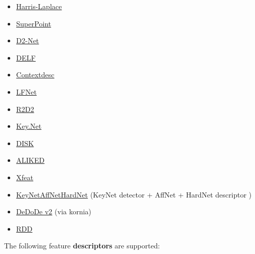 \documentclass{article}
\begin{document}
\begin{itemize}
    \item \href{https://www.robots.ox.ac.uk/~vgg/research/affine/det_eval_files/mikolajczyk_ijcv2004.pdf}{Harris-Laplace} \cite{mikolajczyk_inria00548554}
    \item \href{https://github.com/MagicLeapResearch/SuperPointPretrainedNetwork}{SuperPoint}\cite{detone18superpoint}
    \item \href{https://github.com/mihaidusmanu/d2-net}{D2-Net} \cite{dusmanu2019d2}
    \item \href{https://github.com/tensorflow/models/tree/master/research/delf}{DELF} \cite{noh2017large}
    \item \href{https://github.com/lzx551402/contextdesc}{Contextdesc} \cite{luo2020contextdesc}
    \item \href{https://github.com/vcg-uvic/lf-net-release}{LFNet} \cite{ono2018lf}
    \item \href{https://github.com/naver/r2d2}{R2D2} \cite{revaud2019r2d2}
    \item \href{https://github.com/axelBarroso/Key.Net}{Key.Net} \cite{barroso2020key}
    \item \href{https://arxiv.org/abs/2006.13566}{DISK} \cite{tyszkiewicz2020disk}
    \item \href{https://arxiv.org/abs/2304.03608}{ALIKED} \cite{barroso2023alike}
    \item \href{https://arxiv.org/abs/2404.19174}{Xfeat} \cite{barroso2024xfeat}
    \item \href{https://github.com/axelBarroso/Key.Net}{KeyNetAffNetHardNet} (KeyNet detector \cite{barroso2020key} + AffNet + HardNet descriptor \cite{mishchuk2017working})
    \item \href{https://github.com/Parskatt/DeDoDe}{DeDoDe v2} \cite{edstedt2024dedode,edstedt2024dedodev2} (via kornia)
    \item \href{https://github.com/xtcpete/rdd}{RDD} \cite{chen2025rdd}
\end{itemize}

The following feature \textbf{descriptors} are supported: 
\end{document}
